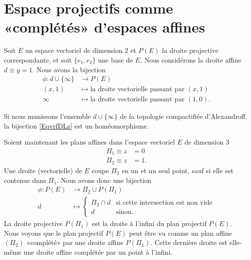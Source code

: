 \section{Espace projectifs comme «complétés» d'espaces affines}

Soit \( E\) un espace vectoriel de dimension \( 2\) et \( P(E)\) la droite projective correspondante, et soit \( \{ e_1,e_2 \}\) une base de \( E\). Nous considérons la droite affine \( d\equiv y=1\). Nous avons la bijection
\begin{equation}        \label{EqvrfDLz}
    \begin{aligned}
        \phi\colon d\cup\{ \infty \}&\to P(E) \\
        (x,1)&\mapsto \text{la droite vectorielle passant par } (x,1) \\
        \infty&\mapsto \text{la droite vectorielle passant par } (1,0).
    \end{aligned}
\end{equation}

\begin{lemma}
    Si nous munissons l'ensemble \( d\cup\{ \infty \}\) de la topologie compactifiée d'Alexandroff, la bijection \eqref{EqvrfDLz} est un homéomorphisme.
\end{lemma}

Soient maintenant les plans affines dans l'espace vectoriel \( E\) de dimension \( 3\)
\begin{subequations}
    \begin{align}
        \Pi_1\equiv z&=0\\
        \Pi_2\equiv z&=1.
    \end{align}
\end{subequations}
Une droite (vectorielle) de \( E\) coupe \( \Pi_2\) en un et un seul point, sauf si elle est contenue dans \( \Pi_1\). Nous avons donc une bijection
\begin{equation}
    \begin{aligned}
        \phi\colon P(E)&\to \Pi_2\cup P(\Pi_1) \\
        d&\mapsto \begin{cases}
            \Pi_2\cap d    &   \text{si cette intersection est non vide}\\
            d    &    \text{sinon.}
        \end{cases}
    \end{aligned}
\end{equation}
La droite projective \( P(\Pi_1)\) est la droite à l'infini du plan projectif \( P(E)\). Nous voyons que le plan projectif \( P(E)\) peut être vu comme un plan affine \( (\Pi_2)\) «complété»  par une droite affine \( P(\Pi_1)\). Cette dernière droite est elle-même une droite affine complétée par un point à l'infini.

